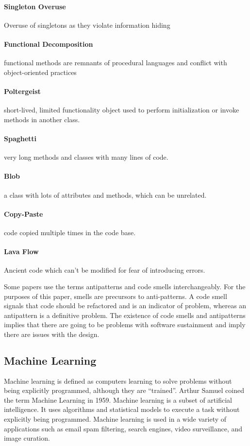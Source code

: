 \documentclass[conference]{IEEEtran}
\begin{document}
\paragraph{Singleton Overuse} Overuse of singletons as they violate information hiding
\paragraph{Functional Decomposition} functional methods are remnants of procedural languages and conflict with object-oriented practices
\paragraph{Poltergeist} short-lived, limited functionality object used to perform initialization or invoke methods in another class.
\paragraph{Spaghetti} very long methods and classes with many lines of code.
\paragraph{Blob} a class with lots of attributes and methods, which can be unrelated.
\paragraph{Copy-Paste} code copied multiple times in the code base.
\paragraph{Lava Flow} Ancient code which can't be modified for fear of introducing errors.

Some papers use the terms antipatterns and code smells interchangeably\cite{singh_systematic_2018}. 
For the purposes of this paper, smells are precursors to anti-patterns. 
A code smell signals that code should be refactored and is an indicator of problem, whereas an antipattern is a definitive problem. 
The existence of code smells and antipatterns implies that there are going to be problems with software sustainment and imply there are issues with the design.


\subsection{Machine Learning}
Machine learning is defined as computers learning to solve problems without being explicitly programmed, although they are ``trained''\cite{bishop_pattern_2006}. 
Arthur Samuel coined the term Machine Learning in 1959\cite{samuel_studies_1988}.
Machine learning is a subset of artificial intelligence. 
It uses algorithms and statistical models to execute a task without explicitly being programmed.
Machine learning is used in a wide variety of applications such as email spam filtering, search engines, video surveillance, and image curation.
\end{document}
